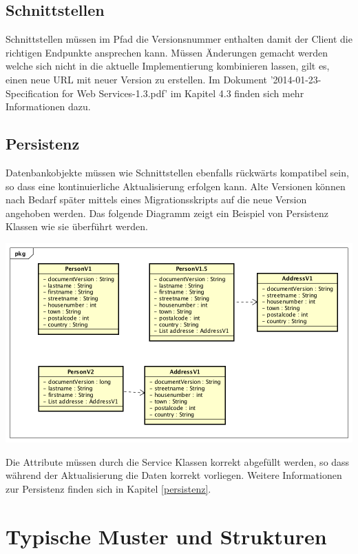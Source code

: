 \subsection{Schnittstellen}

Schnittstellen müssen im Pfad die Versionsnummer enthalten damit der Client die richtigen Endpunkte ansprechen kann. Müssen Änderungen gemacht werden welche sich nicht in die aktuelle Implementierung kombinieren lassen, gilt es, einen neue URL mit neuer Version zu erstellen. Im Dokument '2014-01-23-Specification for Web Services-1.3.pdf' im Kapitel 4.3 finden sich mehr Informationen dazu.

\subsection{Persistenz}

Datenbankobjekte müssen wie Schnittstellen ebenfalls rückwärts kompatibel sein, so dass eine kontinuierliche Aktualisierung erfolgen kann. Alte Versionen können nach Bedarf später mittels eines Migrationsskripts auf die neue Version angehoben werden. Das folgende Diagramm zeigt ein Beispiel von Persistenz Klassen wie sie überführt werden. 
\begin{center}
	\includegraphics[scale=0.6]{ClassMigration.png}\newline
\end{center}
Die Attribute müssen durch die Service Klassen korrekt abgefüllt werden, so dass während der Aktualisierung die Daten korrekt vorliegen. Weitere Informationen zur Persistenz finden sich in Kapitel \ref{persistenz}.

\section{Typische Muster und Strukturen}

